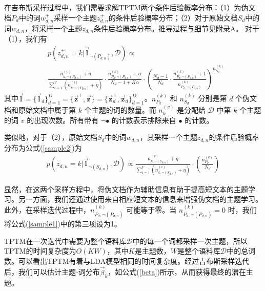 在吉布斯采样过程中，我们需要求解TPTM两个条件后验概率分布：（1）为伪文档$P_d$中的词$w_{d,n}^+$采样一个主题$z_{d,n}^+$的条件后验概率分布；（2）对于原始文档$S_d$中的词$w_{d,n}$，将采样一个主题$z_{d,n}$条件后验概率分布。推导过程与细节见附录A。
对于（1），我们有
\begin{equation}
\label{sample1}
\begin{aligned}
    &p(z_{d,n}^+=k|\boldsymbol{\vec l}_{\neg(P_{d,n})},\mathcal{D})\propto\\
    &\frac{n_{k,\neg(P_{d,n})}^{(v)}+\eta}{\sum_{i=1}^V(n_{k,\neg(P_{d,n})}^{(i)}+\eta)}
    \cdot\frac{n_{P_d,\neg(P_{d,n})}^{(k)}+\alpha}{N_d-1+K\alpha}\cdot\left(\frac{N_d-1}{N_d}\cdot\frac{n_{P_d,\neg(P_{d,n})}^{(k)}+1}{n_{P_d,\neg(P_{d,n})}^{(k)}}\right)^{n_{S_d}^{(k)}}
    \end{aligned}
\end{equation}
其中$\boldsymbol{\vec l}=\{\boldsymbol{\vec l}_d\}_{d=1}^D=\{\boldsymbol{\vec z}^+, \boldsymbol{\vec z}\}=\{\boldsymbol{\vec z}_d^+,\boldsymbol{\vec z}_d\}_{d=1}^D$。$n_{P_d}^{(k)}$ 和 $n_{S_d}^{(k)}$ 分别是第 $d$ 个伪文档和原始文档中属于第 $k$ 个主题的词的数量。而 $n_k^{(v)}$ 是分配给 $\mathcal{D}$ 中第 $k$ 个主题的词 $v$ 的出现次数。所有带有 $\neg\bullet$ 的计数表示排除来自 $\bullet$ 的计数。

类似地，对于（2），原始文档$S_d$中的词$w_{d,n}$，其采样一个主题$z_{d,n}$的条件后验概率分布为公式(\ref{sample2})为
\begin{equation}
    \begin{aligned}
    \label{sample2}
    p(z_{d,n}=k|\boldsymbol{\vec l}_{\neg(S_{d,n})},\mathcal{D})
    \propto\frac{n_{k,\neg(S_{d,n})}^{(v)}+\eta}{\sum_{i=1}^V(n_{k,\neg(S_{d,n})}^{(i)}+\eta)}\cdot\left(\frac{n_{P_d}^{(k)}}{N_d}\right)
    \end{aligned}
\end{equation}

显然，在这两个采样方程中，将伪文档作为辅助信息有助于提高短文本的主题学习。另一方面，我们还通过使用来自相应短文本的信息来增强伪文档的主题学习。此外，在采样迭代过程中，$n_{P_d,\neg(P_{d,n})}^{(k)}$ 可能等于零。当 $n_{P_d,\neg(P_{d,n})}^{(k)}=0$ 时，我们将公式(\ref{sample1})中的第三项设为1。

TPTM在一次迭代中需要为整个语料库$\mathcal{D}$中的每一个词都采样一次主题，所以TPTM的时间复杂度为$O(KW)$，其中$K$是主题数，$W$是整个语料库$\mathcal{D}$中的总词数。可以看出TPTM有着与LDA模型相同的时间复杂度。经过吉布斯采样迭代后，我们可以估计主题-词分布$\vec{\beta}_k$，如公式(\ref{beta})所示，从而获得最终的潜在主题。

